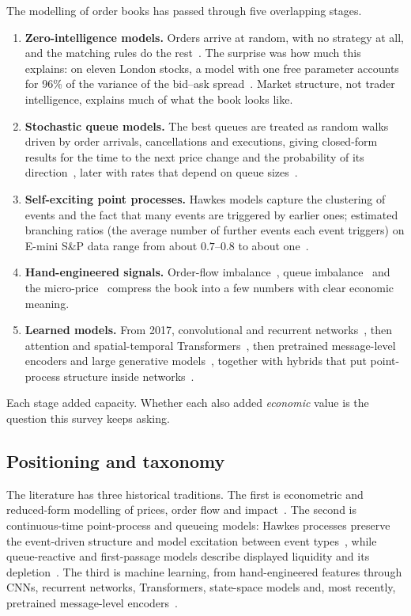 The modelling of order books has passed through five overlapping stages.
\begin{enumerate}[leftmargin=1.8em,itemsep=2pt]
\item \textbf{Zero-intelligence models.} Orders arrive at random, with no strategy at all, and the
  matching rules do the rest~\citep{smith2003}. The surprise was how much this explains: on eleven
  London stocks, a model with one free parameter accounts for 96\% of the variance of the bid--ask
  spread~\citep{farmer2005}. Market structure, not trader intelligence, explains much of what the book
  looks like.
\item \textbf{Stochastic queue models.} The best queues are treated as random walks driven by order
  arrivals, cancellations and executions, giving closed-form results for the time to the next price
  change and the probability of its direction~\citep{cst2010,contlarrard2013}, later with rates that
  depend on queue sizes~\citep{huang2015}.
\item \textbf{Self-exciting point processes.} Hawkes models capture the clustering of events and the
  fact that many events are triggered by earlier ones; estimated branching ratios (the average number of further
  events each event triggers) on E-mini S\&P data
  range from about $0.7$--$0.8$ to about one~\citep{bacry2015,filimonovsornette2012,hardimanbercotbouchaud2013}.
\item \textbf{Hand-engineered signals.} Order-flow imbalance~\citep{cks2014}, queue
  imbalance~\citep{gould2016qi} and the micro-price~\citep{stoikov2018} compress the book into a few
  numbers with clear economic meaning.
\item \textbf{Learned models.} From 2017, convolutional and recurrent networks~\citep{tsantekidis2017,zhang2019},
  then attention and spatial-temporal Transformers~\citep{wallbridge2020,berti2025tlob}, then pretrained
  message-level encoders and large generative models~\citep{linna2025lobert,m3lob}, together with
  hybrids that put point-process structure inside networks~\citep{shi2022sdpnhp,deepqr}.
\end{enumerate}
Each stage added capacity. Whether each also added \emph{economic} value is the question this survey
keeps asking.

\subsection{Positioning and taxonomy}
\label{sec:taxonomy}

The literature has three historical traditions. The first is econometric and reduced-form
modelling of prices, order flow and impact~\citep{kyle1985,glosten1985,cks2014}. The second is
continuous-time point-process and queueing models: Hawkes processes preserve the event-driven
structure and model excitation between event types~\citep{hawkes1971,bacry2015}, while
queue-reactive and first-passage models describe displayed liquidity and its
depletion~\citep{cst2010,huang2015}. The third is machine learning, from hand-engineered features
through CNNs, recurrent networks, Transformers, state-space models and, most recently, pretrained
message-level encoders~\citep{tsantekidis2017,zhang2019,wallbridge2020,linna2025lobert}.

